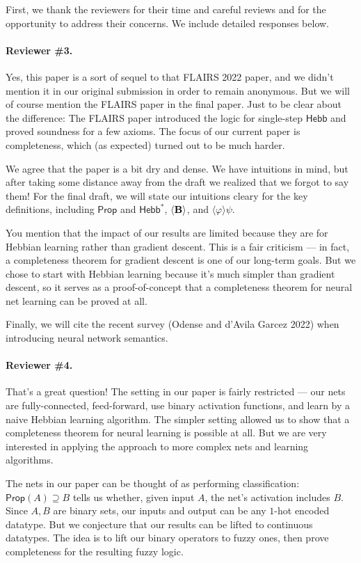 \documentclass[letterpaper]{article}
\title{}
\author{}
\theoremstyle{definition}
\newcommand{\Prop}{\textsf{Prop}}
\newcommand{\HebbNoArgs}{\textsf{Hebb}}
\newcommand{\HebbstarNoArgs}{\textsf{Hebb}^*}
\newcommand{\diaBelieveNoArgs}{\langle \textrm{\textup{\textbf{B}}} \rangle}
\newcommand{\diaHebbop}[1]{\langle #1\rangle}
\begin{document}
First, we thank the reviewers for their time and careful reviews and for the opportunity to address their concerns. We include detailed responses below.

\paragraph{Reviewer \#3.}
Yes, this paper is a sort of sequel to that FLAIRS 2022 paper, and we didn’t mention it in our original submission in order to remain anonymous.  But we will of course mention the FLAIRS paper in the final paper.  Just to be clear about the difference:  The FLAIRS paper introduced the logic for single-step $\HebbNoArgs$ and proved soundness for a few axioms.  The focus of our current paper is completeness, which (as expected) turned out to be much harder.

We agree that the paper is a bit dry and dense.  We have intuitions in mind, but after taking some distance away from the draft we realized that we forgot to say them!  For the final draft, we will state our intuitions cleary for the key definitions, including $\Prop$ and $\HebbstarNoArgs$, $\diaBelieveNoArgs$, and $\diaHebbop{\varphi} \psi$.

You mention that the impact of our results are limited because they are for Hebbian learning rather than gradient descent.  This is a fair criticism --- in fact, a completeness theorem for gradient descent is one of our long-term goals.  But we chose to start with Hebbian learning because it’s much simpler than gradient descent, so it serves as a proof-of-concept that a completeness theorem for neural net learning can be proved at all.

Finally, we will cite the recent survey (Odense and d’Avila Garcez 2022) when introducing neural network semantics.


\paragraph{Reviewer \#4.}
That’s a great question!  The setting in our paper is fairly restricted --- our nets are fully-connected, feed-forward, use binary activation functions, and learn by a naive Hebbian learning algorithm.  The simpler setting allowed us to show that a completeness theorem for neural learning is possible at all.  But we are very interested in applying the approach to more complex nets and learning algorithms.

The nets in our paper can be thought of as performing classification: $\Prop(A) \supseteq B$ tells us whether, given input $A$, the net’s activation includes $B$.  Since $A, B$ are binary sets, our inputs and output can be any $1$-hot encoded datatype.  But we conjecture that our results can be lifted to continuous datatypes.  The idea is to lift our binary operators to fuzzy ones, then prove completeness for the resulting fuzzy logic.
\end{document}
